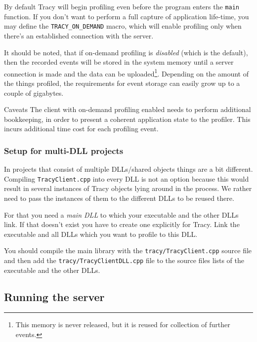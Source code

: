 \documentclass[hidelinks,titlepage,a4paper]{article}
\begin{document}
By default Tracy will begin profiling even before the program enters the \texttt{main} function. If you don't want to perform a full capture of application life-time, you may define the \texttt{TRACY\_ON\_DEMAND} macro, which will enable profiling only when there's an established connection with the server.

It should be noted, that if on-demand profiling is \emph{disabled} (which is the default), then the recorded events will be stored in the system memory until a server connection is made and the data can be uploaded\footnote{This memory is never released, but it is reused for collection of further events.}. Depending on the amount of the things profiled, the requirements for event storage can easily grow up to a couple of gigabytes.

\begin{bclogo}[
noborder=true,
couleur=black!5,
logo=\bcattention
]{Caveats}
The client with on-demand profiling enabled needs to perform additional bookkeeping, in order to present a coherent application state to the profiler. This incurs additional time cost for each profiling event.
\end{bclogo}

\subsubsection{Setup for multi-DLL projects}

In projects that consist of multiple DLLs/shared objects things are a bit different. Compiling \texttt{TracyClient.cpp} into every DLL is not an option because this would result in several instances of Tracy objects lying around in the process. We rather need to pass the instances of them to the different DLLs to be reused there.

For that you need a \emph{main DLL} to which your executable and the other DLLs link. If that doesn't exist you have to create one explicitly for Tracy. Link the executable and all DLLs which you want to profile to this DLL.

You should compile the main library with the \texttt{tracy/TracyClient.cpp} source file and then add the \texttt{tracy/TracyClientDLL.cpp} file to the source files lists of the executable and the other DLLs.

\subsection{Running the server}
\end{document}
